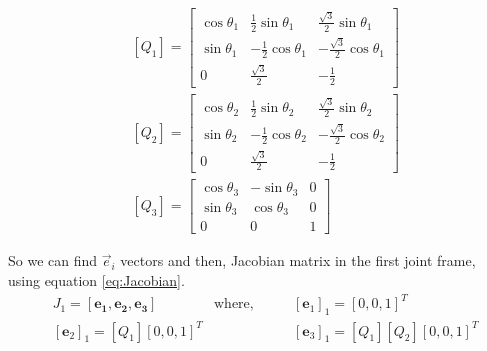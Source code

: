 \documentclass[conference]{IEEEtran}
\begin{document}
\begin{align*}
     & \left[Q_1\right] = \begin{bmatrix}
                              \cos \theta_1 & \frac{1}{2}\sin \theta_1   & \frac{\sqrt{3}}{2} \sin \theta_1   \\
                              \sin \theta_1 & -\frac{1}{2} \cos \theta_1 & - \frac{\sqrt{3}}{2} \cos \theta_1 \\
                              0             & \frac{\sqrt{3}}{2}         & -\frac{1}{2}
                          \end{bmatrix} \\
     & \left[Q_2\right] = \begin{bmatrix}
                              \cos \theta_2 & \frac{1}{2}\sin \theta_2   & \frac{\sqrt{3}}{2} \sin \theta_2   \\
                              \sin \theta_2 & -\frac{1}{2} \cos \theta_2 & - \frac{\sqrt{3}}{2} \cos \theta_2 \\
                              0             & \frac{\sqrt{3}}{2}         & -\frac{1}{2}
                          \end{bmatrix} \\
     & \left[Q_3\right] = \begin{bmatrix}
                              \cos \theta_3 & - \sin \theta_3 & 0 \\
                              \sin \theta_3 & \cos \theta_3   & 0 \\
                              0             & 0               & 1
                          \end{bmatrix}
\end{align*}

So we can find $\vec{e}_i$ vectors and then, Jacobian matrix in the first joint frame, using equation \ref{eq:Jacobian}.
\begin{align*}
     & J_1 = [\mathbf{e_1}, \mathbf{e_2}, \mathbf{e_3}] \quad\quad & \text{where,} \quad\quad & [\mathbf{e}_1]_1 = [0, 0, 1]^T           \\
     & [\mathbf{e}_2]_1 = [Q_1][0, 0, 1]^T                         &                          & [\mathbf{e}_3]_1 = [Q_1][Q_2][0, 0, 1]^T
\end{align*}
\end{document}
